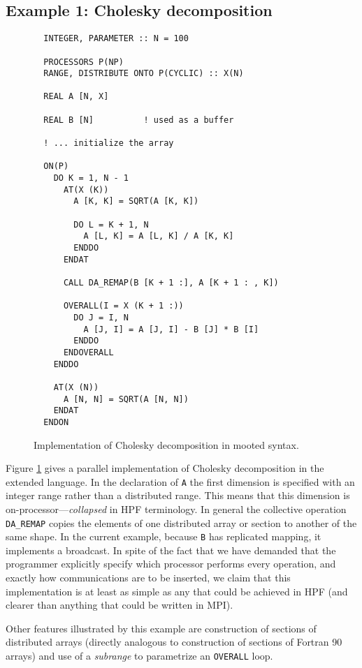 \subsection{Example 1: Cholesky decomposition}

\begin{figure}[btp]
\footnotesize
\begin{verbatim}
  INTEGER, PARAMETER :: N = 100

  PROCESSORS P(NP)
  RANGE, DISTRIBUTE ONTO P(CYCLIC) :: X(N)

  REAL A [N, X]

  REAL B [N]          ! used as a buffer

  ! ... initialize the array

  ON(P)
    DO K = 1, N - 1
      AT(X (K))
        A [K, K] = SQRT(A [K, K])

        DO L = K + 1, N
          A [L, K] = A [L, K] / A [K, K]
        ENDDO
      ENDAT

      CALL DA_REMAP(B [K + 1 :], A [K + 1 : , K])

      OVERALL(I = X (K + 1 :))
        DO J = I, N
          A [J, I] = A [J, I] - B [J] * B [I]
        ENDDO
      ENDOVERALL
    ENDDO

    AT(X (N))
      A [N, N] = SQRT(A [N, N])
    ENDAT
  ENDON
\end{verbatim}
\normalsize
\caption{\label{cholesky}Implementation of Cholesky decomposition
in mooted syntax.}
\end{figure}

Figure \ref{cholesky} gives a parallel implementation
of Cholesky decomposition in the extended language.
In the declaration of {\tt A} the first dimension is specified with
an integer range rather than a distributed range.  This means that
this dimension is on-processor---{\em collapsed} in HPF terminology.
In general the collective operation {\tt DA\_REMAP} copies the elements of
one distributed array or section to another of the same shape.  In the
current example, because {\tt B} has replicated mapping,
it implements a broadcast.
In spite of the fact that we have demanded that the
programmer explicitly specify which processor performs every operation,
and exactly how communications are to be inserted, we claim that this
implementation is at least as simple as any that could be achieved in
HPF (and clearer than anything that could be written in MPI).

Other features illustrated by this example are construction of
sections of distributed arrays (directly analogous to construction
of sections of Fortran 90 arrays) and use of a {\em subrange} to
parametrize an {\tt OVERALL} loop.

